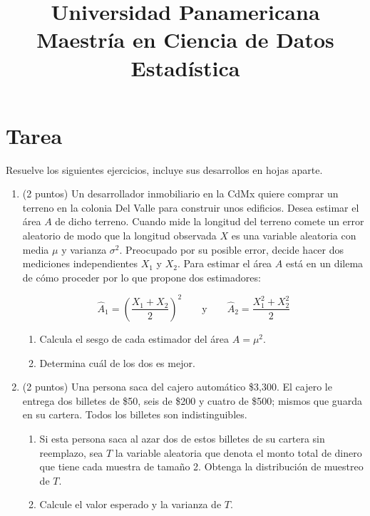 \documentclass[12pt]{article}
\title{Universidad Panamericana \\ Maestría en Ciencia de Datos \\ Estadística}
\date{}
\begin{document}
\maketitle

\section*{Tarea}

Resuelve los siguientes ejercicios, incluye sus desarrollos en hojas aparte.

\begin{enumerate}
    \item (2 puntos) Un desarrollador inmobiliario en la CdMx quiere comprar un terreno en la colonia Del Valle para construir unos edificios. Desea estimar el área $A$ de dicho terreno. Cuando mide la longitud del terreno comete un error aleatorio de modo que la longitud observada $X$ es una variable aleatoria con media $\mu$ y varianza $\sigma^2$. Preocupado por su posible error, decide hacer dos mediciones independientes $X_1$ y $X_2$. Para estimar el área $A$ está en un dilema de cómo proceder por lo que propone dos estimadores:

    \[
    \hat{A}_1 = \left( \frac{X_1 + X_2}{2} \right)^2 \qquad \text{y} \qquad \hat{A}_2 = \frac{X_1^2 + X_2^2}{2}
    \]

    \begin{enumerate}
        \item Calcula el sesgo de cada estimador del área $A = \mu^2$.
        \item Determina cuál de los dos es mejor.
    \end{enumerate}

    \item (2 puntos) Una persona saca del cajero automático \$3,300. El cajero le entrega dos billetes de \$50, seis de \$200 y cuatro de \$500; mismos que guarda en su cartera. Todos los billetes son indistinguibles.

    \begin{enumerate}
        \item Si esta persona saca al azar dos de estos billetes de su cartera sin reemplazo, sea $T$ la variable aleatoria que denota el monto total de dinero que tiene cada muestra de tamaño 2. Obtenga la distribución de muestreo de $T$.
        \item Calcule el valor esperado y la varianza de $T$.
    \end{enumerate}


\end{enumerate}
\end{document}
